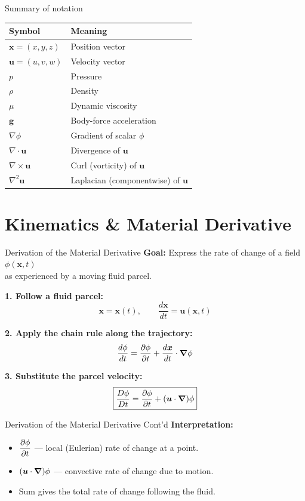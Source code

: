 \documentclass[aspectratio=169]{beamer}
\begin{document}
\begin{frame}{Summary of notation}
\begin{center}
\renewcommand{\arraystretch}{1.4}
\begin{tabular}{l l}
\textbf{Symbol} & \textbf{Meaning} \\ \hline
$\mathbf{x} = (x, y, z)$ & Position vector \\
$\mathbf{u} = (u, v, w)$ & Velocity vector \\
$p$ & Pressure \\
$\rho$ & Density \\
$\mu$ & Dynamic viscosity \\
$\mathbf{g}$ & Body-force acceleration \\
$\nabla \phi$ & Gradient of scalar $\phi$ \\
$\nabla \!\cdot\! \mathbf{u}$ & Divergence of $\mathbf{u}$ \\
$\nabla \!\times\! \mathbf{u}$ & Curl (vorticity) of $\mathbf{u}$ \\
$\nabla^2 \mathbf{u}$ & Laplacian (componentwise) of $\mathbf{u}$
\end{tabular}
\end{center}
\end{frame}

\section{Kinematics \& Material Derivative}

\begin{frame}{Derivation of the Material Derivative}
\small
\textbf{Goal:} Express the rate of change of a field $\phi(\bm{x},t)$ \\
as experienced by a moving fluid parcel.

\vspace{0.4cm}

\textbf{1. Follow a fluid parcel:}
\[
\bm{x} = \bm{x}(t), \qquad \frac{d\bm{x}}{dt} = \bm{u}(\bm{x},t)
\]

\textbf{2. Apply the chain rule along the trajectory:}
\[
\frac{d\phi}{dt}
= \pdv{\phi}{t} + \frac{d\bm{x}}{dt} \cdot \grad \phi
\]

\textbf{3. Substitute the parcel velocity:}
\[
\boxed{
\frac{D\phi}{Dt}
= \pdv{\phi}{t} + (\bm{u}\cdot\grad)\phi
}
\]

\vspace{0.4cm}
\end{frame}

\begin{frame}{Derivation of the Material Derivative Cont'd}
\textbf{Interpretation:}
\begin{itemize}
  \item $\displaystyle \pdv{\phi}{t}$ — local (Eulerian) rate of change at a point.
  \item $\displaystyle (\bm{u}\cdot\grad)\phi$ — convective rate of change due to motion.
  \item Sum gives the total rate of change following the fluid.
\end{itemize}

\end{frame}
\end{document}
